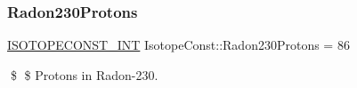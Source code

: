 \subsubsection{\texorpdfstring{Radon230\+Protons}{Radon230Protons}}
{\footnotesize\ttfamily \mbox{\hyperlink{group___isotope_const-_macros_ga5f18360b3e99483a35c32d789e62621c}{I\+S\+O\+T\+O\+P\+E\+C\+O\+N\+S\+T\+\_\+\+I\+NT}} Isotope\+Const\+::\+Radon230\+Protons = 86}

\$ \$ Protons in Radon-\/230. 